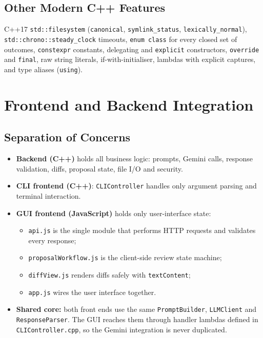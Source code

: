 \documentclass[12pt,a4paper,oneside]{book}
\begin{document}
\subsection{Other Modern C++ Features}
C++17 \texttt{std::\allowbreak{}filesystem} (\texttt{canonical}, \texttt{symlink\_status},
\texttt{lexically\_normal}), \texttt{std::\allowbreak{}chrono::\allowbreak{}steady\_clock} timeouts,
\texttt{enum class} for every closed set of outcomes, \texttt{constexpr}
constants, delegating and \texttt{explicit} constructors, \texttt{override}
and \texttt{final}, raw string literals, if-with-initialiser, lambdas with
explicit captures, and type aliases (\texttt{using}).

\section{Frontend and Backend Integration}
\label{sec:ca-integration}

\subsection{Separation of Concerns}
\begin{itemize}
  \item \textbf{Backend (C++)} holds all business logic: prompts, Gemini
    calls, response validation, diffs, proposal state, file I/O and
    security.
  \item \textbf{CLI frontend (C++)}: \texttt{CLIController} handles only
    argument parsing and terminal interaction.
  \item \textbf{GUI frontend (JavaScript)} holds only user-interface state:
    \begin{itemize}
      \item \texttt{api.js} is the single module that performs HTTP requests
        and validates every response;
      \item \texttt{proposalWorkflow.js} is the client-side review state
        machine;
      \item \texttt{diffView.js} renders diffs safely with
        \texttt{textContent};
      \item \texttt{app.js} wires the user interface together.
    \end{itemize}
  \item \textbf{Shared core:} both front ends use the same
    \texttt{PromptBuilder}, \texttt{LLMClient} and \texttt{ResponseParser}.
    The GUI reaches them through handler lambdas defined in
    \texttt{CLIController.cpp}, so the Gemini integration is never
    duplicated.
\end{itemize}
\end{document}
